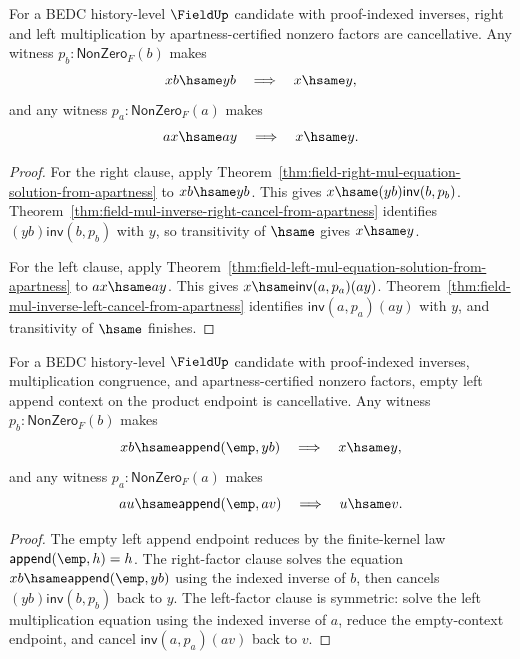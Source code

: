\begin{theorem}
\label{thm:field-nonzero-mul-cancel-from-apartness}
For a BEDC history-level $\FieldUp$ candidate with proof-indexed inverses,
right and left multiplication by apartness-certified nonzero factors are
cancellative. Any witness $p_b:\mathsf{NonZero}_F(b)$ makes
$$
xb\hsame yb
\quad\Longrightarrow\quad
x\hsame y,
$$
and any witness $p_a:\mathsf{NonZero}_F(a)$ makes
$$
ax\hsame ay
\quad\Longrightarrow\quad
x\hsame y.
$$
\end{theorem}
\begin{proof}
For the right clause, apply
Theorem~\ref{thm:field-right-mul-equation-solution-from-apartness} to
$xb\hsame yb$. This gives
$x\hsame (yb)\mathsf{inv}(b,p_b)$. Theorem~\ref{thm:field-mul-inverse-right-cancel-from-apartness}
identifies $(yb)\mathsf{inv}(b,p_b)$ with $y$, so transitivity of
$\hsame$ gives $x\hsame y$.

For the left clause, apply
Theorem~\ref{thm:field-left-mul-equation-solution-from-apartness} to
$ax\hsame ay$. This gives
$x\hsame \mathsf{inv}(a,p_a)(ay)$. Theorem~\ref{thm:field-mul-inverse-left-cancel-from-apartness}
identifies $\mathsf{inv}(a,p_a)(ay)$ with $y$, and transitivity of
$\hsame$ finishes.
\end{proof}

\begin{theorem}
\label{thm:field-nonzero-mul-empty-context-cancel-from-apartness}
For a BEDC history-level $\FieldUp$ candidate with proof-indexed inverses,
multiplication congruence, and apartness-certified nonzero factors, empty left
append context on the product endpoint is cancellative. Any witness
$p_b:\mathsf{NonZero}_F(b)$ makes
$$
xb\hsame \mathsf{append}(\emp,yb)
\quad\Longrightarrow\quad
x\hsame y,
$$
and any witness $p_a:\mathsf{NonZero}_F(a)$ makes
$$
au\hsame \mathsf{append}(\emp,av)
\quad\Longrightarrow\quad
u\hsame v.
$$
\end{theorem}
\begin{proof}
The empty left append endpoint reduces by the finite-kernel law
\(\mathsf{append}(\emp,h)=h\). The right-factor clause solves the equation
\(xb\hsame \mathsf{append}(\emp,yb)\) using the indexed inverse of \(b\), then
cancels \((yb)\mathsf{inv}(b,p_b)\) back to \(y\). The left-factor clause is
symmetric: solve the left multiplication equation using the indexed inverse of
\(a\), reduce the empty-context endpoint, and cancel
\(\mathsf{inv}(a,p_a)(av)\) back to \(v\).
\end{proof}

